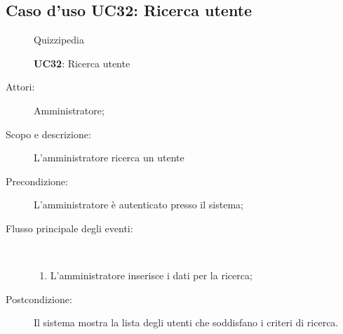 \subsection{Caso d'uso UC32: Ricerca utente}
\begin{figure}[H]
	\centering
	\begin{resizedtikzpicture}{\textwidth}
		\begin{umlsystem}[x=0, fill=lightgray!20]{Quizzipedia}
		\end{umlsystem}
	\end{resizedtikzpicture}
	\caption{\textbf{UC32}: Ricerca utente}
	\label{UC32}
\end{figure}
\begin{description}
	\item[Attori:] Amministratore;
	\item[Scopo e descrizione:] L'amministratore ricerca un utente
	\item[Precondizione:] L'amministratore è autenticato presso il sistema;
	
	\item[Flusso principale degli eventi:] \ 
	\begin{enumerate}
		\item L'amministratore inserisce i dati per la ricerca;
		
	\end{enumerate}
	\item[Postcondizione:] Il sistema mostra la lista degli utenti che soddisfano i criteri di ricerca.
\end{description}
\hypertarget{UC33}{}
